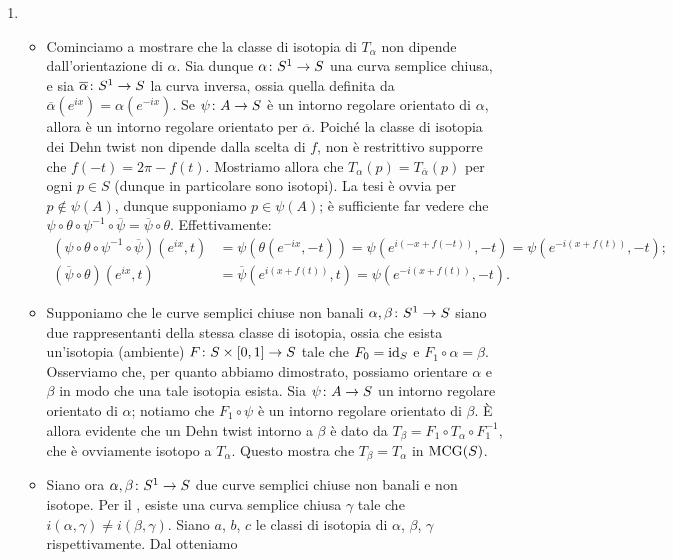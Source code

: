 \begin{enumerate}[(1)]
\item \begin{itemize}
\item Cominciamo a mostrare che la classe di isotopia di $T_\alpha$ non dipende dall'orientazione di $\alpha$. Sia dunque $\map{\alpha}{S^1}{S}$ una curva semplice chiusa, e sia $\map{\overline\alpha}{S^1}{S}$ la curva inversa, ossia quella definita da $\overline\alpha(e^{ix})=\alpha(e^{-ix})$. Se $\map{\psi}{A}{S}$ è un intorno regolare orientato di $\alpha$, allora
è un intorno regolare orientato per $\overline\alpha$. Poiché la classe di isotopia dei Dehn twist non dipende dalla scelta di $f$, non è restrittivo supporre che $f(-t)=2\pi-f(t)$. Mostriamo allora che $T_\alpha(p)=T_{\overline\alpha}(p)$ per ogni $p\in S$ (dunque in particolare sono isotopi). La tesi è ovvia per $p\not\in\psi(A)$, dunque supponiamo $p\in\psi(A)$; è sufficiente far vedere che $\psi\circ\theta\circ\psi^{-1}\circ\overline\psi=\overline\psi\circ\theta$. Effettivamente:
\begin{align*}
(\psi\circ\theta\circ\psi^{-1}\circ\overline\psi)(e^{ix},t)&=\psi(\theta(e^{-ix},-t))=\psi(e^{i(-x+f(-t))},-t)=\psi(e^{-i(x+f(t))},-t);\\
(\overline\psi\circ\theta)(e^{ix},t)&=\overline\psi(e^{i(x+f(t))},t)=\psi(e^{-i(x+f(t))},-t).
\end{align*}
\item Supponiamo che le curve semplici chiuse non banali $\map{\alpha,\beta}{S^1}{S}$ siano due rappresentanti della stessa classe di isotopia, ossia che esista un'isotopia (ambiente) $\map{F}{S\times[0,1]}{S}$ tale che $F_0=\operatorname{id}_S$ e $F_1\circ\alpha=\beta$. Osserviamo che, per quanto abbiamo dimostrato, possiamo orientare $\alpha$ e $\beta$ in modo che una tale isotopia esista. Sia $\map{\psi}{A}{S}$ un intorno regolare orientato di $\alpha$; notiamo che $F_1\circ\psi$ è un intorno regolare orientato di $\beta$. È allora evidente che un Dehn twist intorno a $\beta$ è dato da $T_\beta=F_1\circ T_\alpha\circ F_1^{-1}$, che è ovviamente isotopo a $T_\alpha$. Questo mostra che $T_\beta=T_\alpha$ in $\operatorname{MCG}(S)$.
\item Siano ora $\map{\alpha,\beta}{S^1}{S}$ due curve semplici chiuse non banali e non isotope. Per il , esiste una curva semplice chiusa $\gamma$ tale che $i(\alpha,\gamma)\neq i(\beta,\gamma)$. Siano $a$, $b$, $c$ le classi di isotopia di $\alpha$, $\beta$, $\gamma$ rispettivamente. Dal  otteniamo

\end{itemize}
\end{enumerate}
